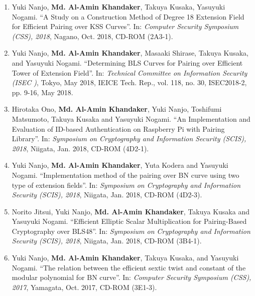 \documentclass{article}[paper=a4,10pt]
\begin{document}
\begin{enumerate}
	\item Yuki Nanjo,  \textbf{Md. Al-Amin Khandaker}, Takuya Kusaka, Yasuyuki \\Nogami. ``A Study on a Construction Method of Degree 18 Extension Field for Efficient Pairing over KSS Curves''. In: \textit{Computer Security Symposium  (CSS),  2018}, Nagano, Oct. 2018, CD-ROM (2A3-1). 
	\item Yuki Nanjo, \textbf{Md. Al-Amin Khandaker}, Masaaki Shirase, Takuya Kusaka, and Yasuyuki Nogami.
	``Determining BLS Curves for Pairing over Efficient Tower of Extension Field''.
	In: {\it Technical Committee on Information Security (ISEC )}, Tokyo, May 2018,
	IEICE Tech. Rep., vol. 118, no. 30, ISEC2018-2, pp. 9-16, May 2018.
	
	\item  Hirotaka Ono, \textbf{Md. Al-Amin Khandaker}, Yuki Nanjo, Toshifumi Matsumoto, Takuya Kusaka and Yasuyuki Nogami. ``An Implementation and Evaluation of ID-based Authentication on Raspberry Pi with Pairing Library''. In: \textit{Symposium on Cryptography and Information Security (SCIS),  2018}, Niigata, Jan. 2018, CD-ROM (4D2-1).  
	
	\item Yuki Nanjo, \textbf{Md. Al-Amin Khandaker}, Yuta Kodera and Yasuyuki Nogami. ``Implementation method of the pairing over BN curve using two type of extension fields''. In: \textit{Symposium on Cryptography and Information Security (SCIS),  2018}, Niigata, Jan. 2018, CD-ROM (4D2-3).
	
	\item  Norito Jitsui, Yuki Nanjo, \textbf{Md. Al-Amin Khandaker}, Takuya Kusaka and Yasuyuki Nogami. ``Efficient Elliptic Scalar Multiplication for Pairing-Based Cryptography over BLS48''. In:  \textit{Symposium on Cryptography and Information Security (SCIS),  2018}, Niigata, Jan. 2018,  CD-ROM (3B4-1).
	
	\item Yuki Nanjo,  \textbf{Md. Al-Amin Khandaker}, Takuya Kusaka, and  Yasuyuki Nogami. ``The relation between the efficient sextic twist and constant of the modular polynomial for BN curve''. In: \textit{Computer Security Symposium  (CSS),  2017}, Yamagata, Oct. 2017, CD-ROM (3E1-3). 
	
\end{enumerate}
\normalsize
\end{document}
